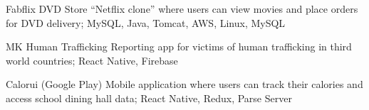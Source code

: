 
\begin{cvskills}
	
	\cvskill
	{Fabflix DVD Store} %
	{“Netflix clone” where users can view movies and place orders for DVD delivery; MySQL, Java, Tomcat, AWS, Linux, MySQL}
	
	\cvskill
	{MK Human Trafficking} %
	{Reporting app for victims of human trafficking in third world countries; React Native, Firebase} %
	
	\cvskill
	{Calorui (Google Play)} %
	{Mobile application where users can track their calories and access school dining hall data; React Native, Redux, Parse Server} %
	
	
\end{cvskills}
